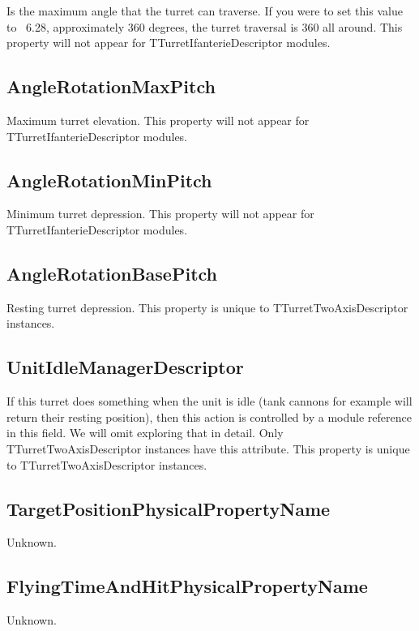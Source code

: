 \documentclass{article}
\begin{document}
Is the maximum angle that the turret can traverse. If you were to set this value to ~6.28, approximately 360 degrees, the turret traversal is 360 all around. This property will not appear for TTurretIfanterieDescriptor modules.

\subsection{AngleRotationMaxPitch}

Maximum turret elevation. This property will not appear for TTurretIfanterieDescriptor modules.

\subsection{AngleRotationMinPitch}

Minimum turret depression. This property will not appear for TTurretIfanterieDescriptor modules.

\subsection{AngleRotationBasePitch}

Resting turret depression. This property is unique to TTurretTwoAxisDescriptor instances.

\subsection{UnitIdleManagerDescriptor}

If this turret does something when the unit is idle (tank cannons for example will return their resting position), then this action is controlled by a module reference in this field. We will omit exploring that in detail. Only TTurretTwoAxisDescriptor instances have this attribute. This property is unique to TTurretTwoAxisDescriptor instances.

\subsection{TargetPositionPhysicalPropertyName}

Unknown.

\subsection{FlyingTimeAndHitPhysicalPropertyName}

Unknown.
\end{document}
